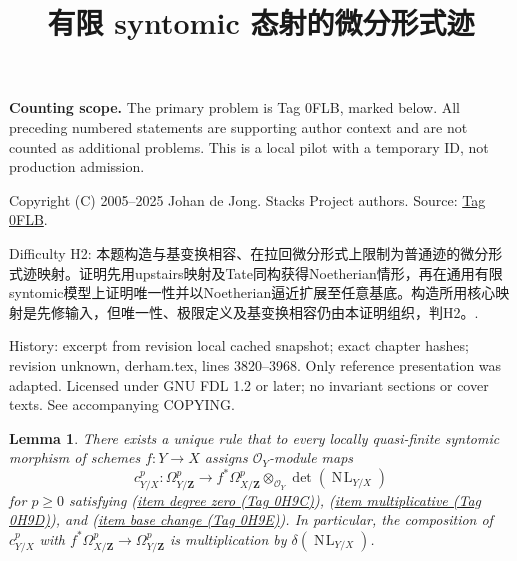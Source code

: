 \documentclass{amsart}
\theoremstyle{plain}
\newtheorem{lemma}[subsection]{Lemma}
\theoremstyle{definition}
\theoremstyle{remark}
\numberwithin{equation}{subsection}
\def\NL{\mathop{N\!L}\nolimits}
\begin{document}
\title[Stacks Project, Tag 0FLB]{有限 syntomic 态射的微分形式迹}
\maketitle
\noindent\textbf{Counting scope.} The primary problem is Tag 0FLB, marked below. All preceding numbered statements are supporting author context and are not counted as additional problems. This is a local pilot with a temporary ID, not production admission.


\noindent Copyright (C) 2005--2025 Johan de Jong. Stacks Project authors. Source: \href{https://stacks.math.columbia.edu/tag/0FLB}{Tag 0FLB}.

\noindent Difficulty H2: 本题构造与基变换相容、在拉回微分形式上限制为普通迹的微分形式迹映射。证明先用upstairs映射及Tate同构获得Noetherian情形，再在通用有限syntomic模型上证明唯一性并以Noetherian逼近扩展至任意基底。构造所用核心映射是先修输入，但唯一性、极限定义及基变换相容仍由本证明组织，判H2。.

\noindent History: excerpt from revision local cached snapshot; exact chapter hashes; revision unknown, derham.tex, lines 3820--3968. Only reference presentation was adapted. Licensed under GNU FDL 1.2 or later; no invariant sections or cover texts. See accompanying COPYING.

\begin{lemma}
\label{lemma-Garel-upstairs}
There exists a unique rule that to every locally quasi-finite syntomic
morphism of schemes $f : Y \to X$ assigns $\mathcal{O}_Y$-module maps
$$
c^p_{Y/X} :
\Omega^p_{Y/\mathbf{Z}}
\longrightarrow
f^*\Omega^p_{X/\mathbf{Z}} \otimes_{\mathcal{O}_Y} \det(\NL_{Y/X})
$$
for $p \geq 0$ satisfying (\href{https://stacks.math.columbia.edu/tag/0H9C}{item degree zero (Tag 0H9C)}), (\href{https://stacks.math.columbia.edu/tag/0H9D}{item multiplicative (Tag 0H9D)}),
and (\href{https://stacks.math.columbia.edu/tag/0H9E}{item base change (Tag 0H9E)}). In particular, the composition of
$c^p_{Y/X}$ with $f^*\Omega^p_{X/\mathbf{Z}} \to \Omega^p_{Y/\mathbf{Z}}$
is multiplication by $\delta(\NL_{Y/X})$.
\end{lemma}
\end{document}
